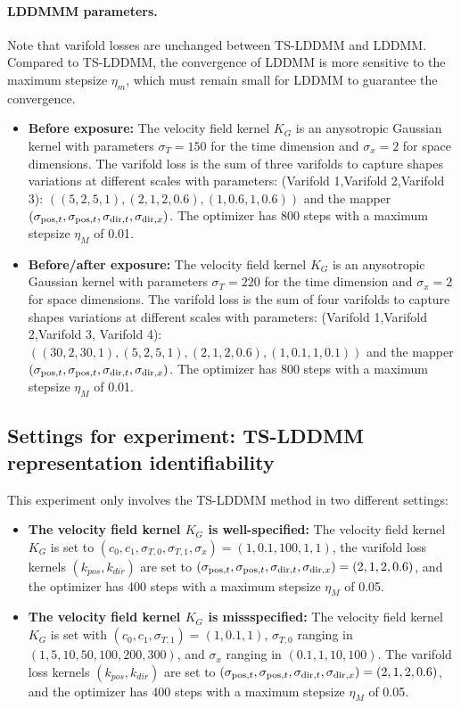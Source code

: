 \paragraph{LDDMMM parameters.} Note that varifold losses are unchanged between TS-LDDMM and LDDMM. Compared to TS-LDDMM, the convergence of LDDMM is more sensitive to the maximum stepsize $\eta_m$, which must remain small for LDDMM to guarantee the convergence.
\begin{itemize}
  \item \textbf{Before exposure:} The velocity field kernel $K_G$ is an anysotropic Gaussian kernel with parameters $\sigma_{T} =150$ for the time dimension and $\sigma_x = 2$ for space dimensions. 
  The varifold loss is the sum of three varifolds to capture shapes variations at different scales with parameters: (Varifold 1,Varifold 2,Varifold 3): $\left((5,2,5,1),(2,1,2,0.6),(1,0.6,1,0.6)\right)$ and the mapper $(\sigma_{\mathrm{pos},t}, \sigma_{\mathrm{pos},t}, \sigma_{\mathrm{dir},t}, \sigma_{\mathrm{dir},x})$. The optimizer has 800 steps with a maximum stepsize $\eta_M$ of 0.01.
  \item \textbf{Before/after exposure:} The velocity field kernel $K_G$ is an anysotropic Gaussian kernel with parameters $\sigma_{T} =220$ for the time dimension and $\sigma_x = 2$ for space dimensions.
  The varifold loss is the sum of four varifolds to capture shapes variations at different scales with parameters: (Varifold 1,Varifold 2,Varifold 3, Varifold 4): $\left((30,2,30,1),(5,2,5,1),(2,1,2,0.6),(1,0.1,1,0.1)\right)$ and the mapper $(\sigma_{\mathrm{pos},t}, \sigma_{\mathrm{pos},t}, \sigma_{\mathrm{dir},t}, \sigma_{\mathrm{dir},x})$. The optimizer has 800 steps with a maximum stepsize $\eta_M$ of 0.01.
\end{itemize}


\subsection{Settings for experiment: TS-LDDMM representation identifiability}
\label{appendix: settings_identifiability}
This experiment only involves the TS-LDDMM method in two different settings: 
\begin{itemize}
  \item \textbf{The velocity field kernel $K_G$ is well-specified:} The velocity field kernel $K_G$ is set to $ (c_0,c_1,\sigma_{T,0},\sigma_{T,1},\sigma_x) = (1,0.1,100,1,1)$, the varifold loss kernels $(k_{pos},k_{dir})$ are set to $(\sigma_{\mathrm{pos},t}, \sigma_{\mathrm{pos},t}, \sigma_{\mathrm{dir},t}, \sigma_{\mathrm{dir},x}) = (2,1,2,0.6)$, and the optimizer has 400 steps with a maximum stepsize $\eta_M$ of 0.05.
  \item \textbf{The velocity field kernel $K_G$ is missspecified:} The velocity field kernel $K_G$ is set with  $(c_0,c_1,\sigma_{T,1}) = (1,0.1,1)$, $\sigma_{T,0}$ ranging in $(1,5,10,50,100,200,300)$, and $\sigma_x$  ranging in $(0.1,1,10,100)$. The varifold loss kernels $(k_{pos},k_{dir})$ are set to $(\sigma_{\mathrm{pos},t}, \sigma_{\mathrm{pos},t}, \sigma_{\mathrm{dir},t}, \sigma_{\mathrm{dir},x}) = (2,1,2,0.6)$, and the optimizer has 400 steps with a maximum stepsize $\eta_M$ of 0.05.
\end{itemize}

